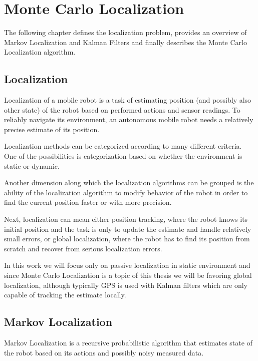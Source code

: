 \chapter{Monte Carlo Localization}
\label{chap:mcl}

The following chapter defines the localization problem, provides an overview
of Markov Localization and Kalman Filters and finally describes
the Monte Carlo Localization algorithm.

\section{Localization}
Localization of a mobile robot is a task of estimating position (and possibly
also other state) of the robot based on performed actions and sensor readings.
To reliably navigate its environment, an autonomous mobile robot needs
a relatively precise estimate of its position.

Localization methods can be categorized according to many different criteria.
One of the possibilities is categorization based on whether the environment is static
or dynamic.

Another dimension along which the localization algorithms can be grouped
is the ability of the localization algorithm to modify behavior of the robot
in order to find the current position faster or with more precision.

Next, localization can mean either position tracking, where the robot knows its initial
position and the task is only to update the estimate and handle relatively small
errors, or global localization, where the robot has to find its position from scratch
and recover from serious localization errors.

In this work we will focus only on passive localization in static environment and
since Monte Carlo Localization is a topic of this thesis we will be favoring
global localization, although typically GPS is used with Kalman filters
which are only capable of tracking the estimate locally.

\section{Markov Localization}

Markov Localization \cite{fox98,diard03} is a recursive probabilistic
algorithm that estimates state of the robot based on its
actions and possibly noisy measured data.

